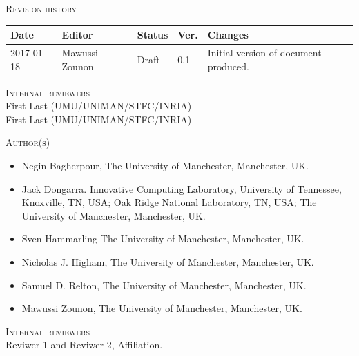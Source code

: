 \documentclass[a4paper,12pt]{article}
\begin{document}
\vspace{2em}


\noindent
\textsc{Revision history}\\[1em]
\begin{tabularx}{\linewidth}{@{}|l|l|l|l|X|}
  \hline
  \rowcolor{orange}
  \bf Date & \bf Editor & \bf Status & \bf Ver. & \bf Changes \\
  \hline
  2017-01-18 & Mawussi Zounon & Draft & 0.1 & Initial version of
                                             document produced. \\
  \hline
\end{tabularx}


\vspace{2em}

\noindent
\textsc{Internal reviewers}\\[1em]
First Last (UMU/UNIMAN/STFC/INRIA)\\
First Last (UMU/UNIMAN/STFC/INRIA)

\vspace{2em}



\noindent
\textsc{Author(s)}\\[1em]
\begin{itemize}
\item Negin Bagherpour, The University of Manchester, Manchester, UK.
\item Jack Dongarra. Innovative Computing Laboratory, University of Tennessee, Knoxville,
TN, USA; Oak Ridge National Laboratory, TN, USA; The University of Manchester, Manchester, UK.
\item Sven Hammarling The University of Manchester, Manchester, UK.
\item Nicholas J. Higham, The University of Manchester, Manchester, UK.
\item Samuel D. Relton, The University of Manchester, Manchester, UK.
\item Mawussi Zounon, The University of Manchester, Manchester, UK.
\end{itemize}
\vspace{2em}



\noindent
\textsc{Internal reviewers}\\[1em]
Reviwer 1 and Reviwer 2, Affiliation.\\

\vspace{2em}
\end{document}
